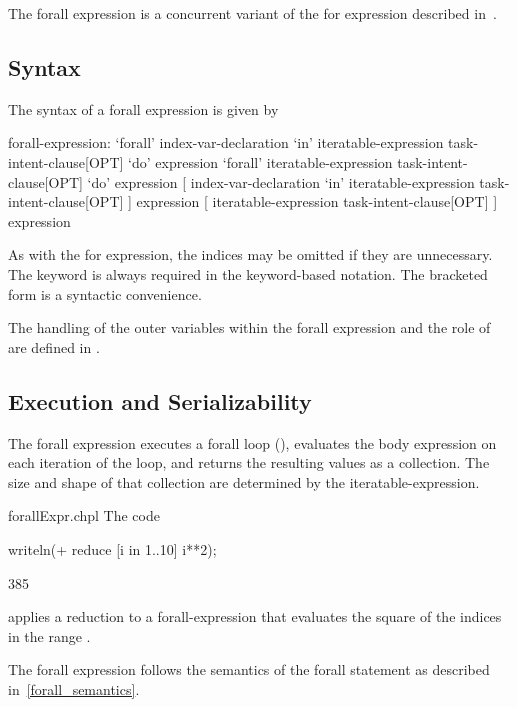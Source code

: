 The forall expression is a concurrent variant of the for expression
described in~.

\subsection{Syntax}
\label{forall_expr_syntax}

The syntax of a forall expression is given by
\begin{syntax}
forall-expression:
  `forall' index-var-declaration `in' iteratable-expression task-intent-clause[OPT] `do' expression
  `forall' iteratable-expression task-intent-clause[OPT] `do' expression
  [ index-var-declaration `in' iteratable-expression task-intent-clause[OPT] ] expression
  [ iteratable-expression task-intent-clause[OPT] ] expression
\end{syntax}
As with the for expression, the indices may be omitted if they are
unnecessary.  The  keyword is always required in the
keyword-based notation.  The bracketed form is a syntactic
convenience.

The handling of the outer variables within the forall expression and
the role of  are defined in .

\subsection{Execution and Serializability}
\label{Forall_Expression_Execution_and_Serializability}

The forall expression executes a forall loop (),
evaluates the body expression on each iteration of the loop, and
returns the resulting values as a collection.  The size and shape of
that collection are determined by the iteratable-expression.

\begin{chapelexample}{forallExpr.chpl}
The code
\begin{chapel}
writeln(+ reduce [i in 1..10] i**2);
\end{chapel}
\begin{chapeloutput}
385
\end{chapeloutput}
applies a reduction to a forall-expression that evaluates the square
of the indices in the range .
\end{chapelexample}

The forall expression follows the semantics of the forall statement as
described in~\ref{forall_semantics}.

